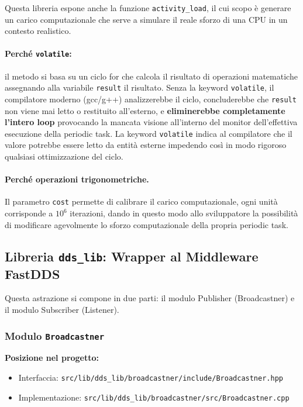Questa libreria espone anche la funzione \texttt{activity\_load}, il cui scopo è generare un carico computazionale che serve a simulare il reale sforzo di una CPU in un contesto realistico. 

\paragraph{Perché \texttt{volatile}:} il metodo si basa su un ciclo for che calcola il risultato di operazioni matematiche assegnando alla variabile \texttt{result} il risultato. Senza la keyword \texttt{volatile}, il compilatore moderno (gcc/g++) analizzerebbe il ciclo, concluderebbe che \texttt{result} non viene mai letto o restituito all'esterno, e \textbf{eliminerebbe completamente l'intero loop} provocando la mancata visione all'interno del monitor dell'effettiva esecuzione della periodic task. La keyword \texttt{volatile} indica al compilatore che il valore potrebbe essere letto da entità esterne  impedendo così in modo rigoroso qualsiasi ottimizzazione del ciclo.

\paragraph{Perché operazioni trigonometriche.}  Il parametro \texttt{cost} permette di calibrare il carico computazionale, ogni unità corrisponde a $10^6$ iterazioni, dando in questo modo allo sviluppatore la possibilità di modificare agevolmente lo sforzo computazionale della propria periodic task.


\subsection{Libreria \texttt{dds\_lib}: Wrapper al Middleware FastDDS}

Questa astrazione si compone in due parti: il modulo Publisher (Broadcastner) e il modulo Subscriber (Listener).

\subsubsection{Modulo \texttt{Broadcastner}}
\label{sec:lib_broadcastner}

\noindent\textbf{Posizione nel progetto:}
\begin{itemize}
	\item Interfaccia: \texttt{src/lib/dds\_lib/broadcastner/include/Broadcastner.hpp}
	\item Implementazione: \texttt{src/lib/dds\_lib/broadcastner/src/Broadcastner.cpp}
\end{itemize}

